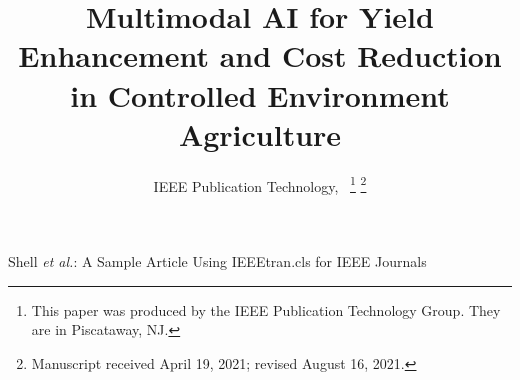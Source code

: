 \documentclass[lettersize,journal]{IEEEtran}
\begin{document}
\title{Multimodal AI for Yield Enhancement and Cost Reduction in Controlled Environment Agriculture}

\author{IEEE Publication Technology,~
\thanks{This paper was produced by the IEEE Publication Technology Group. They are in Piscataway, NJ.}%
\thanks{Manuscript received April 19, 2021; revised August 16, 2021.}}

%
{Shell \MakeLowercase{\textit{et al.}}: A Sample Article Using IEEEtran.cls for IEEE Journals}


\maketitle
\end{document}
